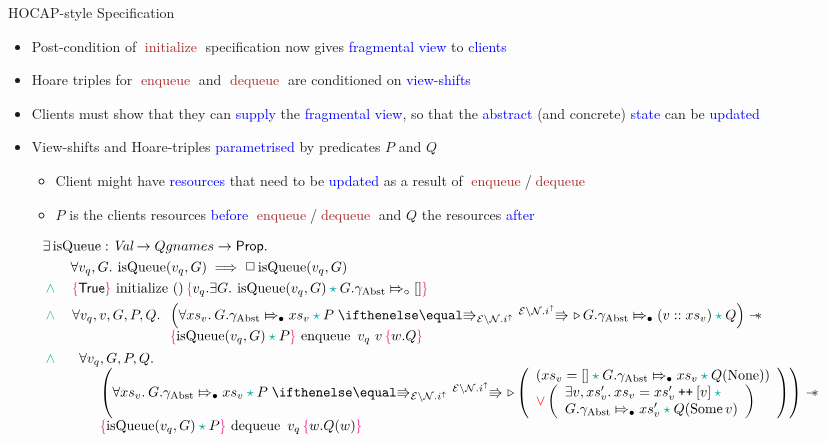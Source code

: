 \documentclass[9pt,xcolor={dvipsnames}]{beamer}
\newcommand{\initialise}{\operatorname{initialize}}
\newcommand{\enqueue}{\operatorname{enqueue}}
\newcommand{\dequeue}{\operatorname{dequeue}}
\newcommand{\isqueue}{\operatorname{isQueue}}
\newcommand{\Qgnames}{Qgnames}
\newcommand{\vq}{v_q}
\newcommand{\nodeval}{\valB}
\newcommand{\absvalue}{\val}
\newcommand{\absvalueList}{xs_v}
\newcommand{\Qg}{G}
\newcommand{\gabst}{\gname_{\mathrm{Abst}}}
\newcommand\catenate{\mathbin{\text{\ttfamily\upshape ++}}}
\newcommand{\Nl}{\ensuremath{\mathcal{N}}}
\newcommand{\abstractstatefullfrag}[2]{#1 \Mapsto_{\circ} #2}
\newcommand{\abstractstateauth}[2]{#1 \Mapsto_{\bullet} #2}
\newcommand{\hocapspecinitHTGen}[2]{\hoare{\TRUE}{\initialise \ \TT}{#1 . \Exists #2 . \isqueue(#1, #2) \star{} \abstractstatefullfrag{#2.\gabst}{[]}}}
\newcommand{\hocapspecinitGen}[2]{\hocapspecinitHTGen{#1}{#2}}
\newcommand{\hocapspecinit}{\hocapspecinitGen{\vq}{\Qg}}
\newcommand{\hocapspecenqVS}[5]{\abstractstateauth{#2.\gabst}{#5} \star{} #3 \vs[\mask\setminus\Nl.i^\uparrow] \later \abstractstateauth{#2.\gabst}{(#1 :: #5)} \star{} #4}
\newcommand{\hocapspecenqHT}[5]{\hoare{\isqueue(#1, #3) \star{} #4}{\enqueue \ #1 \ #2}{\valB . #5}}
\newcommand{\hocapspecenqGen}[6]{\All #1, #2, #3, #4, #5.
\begin{array}[t]{l}
\left(\All #6 . \hocapspecenqVS{#2}{#3}{#4}{#5}{#6} \right)
\wand\\
\hocapspecenqHT{#1}{#2}{#3}{#4}{#5}
\end{array}}
\newcommand{\hocapspecenq}{\hocapspecenqGen{\vq}{\absvalue}{\Qg}{P}{Q}{\absvalueList}}
\newcommand{\hocapspecdeqVSGen}[6]{
  \abstractstateauth{#1.\gabst}{#4} \star{} #2 \vs[\mask\setminus\Nl.i^\uparrow] \later
  \left(
    \begin{array}{l}
      (#4 = [] \star{} \abstractstateauth{#1.\gabst}{#4} \star{} #3(\None))\\
      \lor{}
      \left(
        \begin{array}{l}
          \Exists #5, #6 . #4 = #6 \catenate [#5] \star{}\\
          \abstractstateauth{#1.\gabst}{#6} \star{} #3(\Some{#5})
        \end{array}
        \right)
    \end{array}
  \right)
}
\newcommand{\hocapspecdeqVS}[4]{\hocapspecdeqVSGen{#1}{#2}{#3}{#4}{\absvalue}{#4'}}
\newcommand{\hocapspecdeqHT}[4]{\hoare{\isqueue(#1, #2) \star{} #3}{\dequeue \ #1}{\nodeval . #4(\nodeval)}}
\newcommand{\hocapspecdeqGen}[5]{\begin{array}[t]{l}
  \All #1, #2, #3, #4.\\
  \begin{array}[t]{l}
  \quad\left(\All #5 . \hocapspecdeqVS{#2}{#3}{#4}{#5} \right) \wand\\
  \quad\hocapspecdeqHT{#1}{#2}{#3}{#4}
  \end{array}
\end{array}}
\newcommand{\hocapspecdeq}{\hocapspecdeqGen{\vq}{\Qg}{P}{Q}{\absvalueList}}
\let\oldlor\lor
\renewcommand{\lor}{\begingroup \color{red} \oldlor \endgroup}
\let\oldland\land
\renewcommand{\land}{\begingroup \color{Emerald} \oldland \endgroup}
\let\oldstar\star
\renewcommand{\star}{\begingroup \color{Emerald} \oldstar \endgroup}
\begin{document}
\begin{frame}{HOCAP-style Specification}
  \begin{itemize}
    \item Post-condition of \textcolor{Brown}{$\initialise$} specification now gives \textcolor{blue}{fragmental view} to \textcolor{blue}{clients}
    \item Hoare triples for \textcolor{Brown}{$\enqueue$} and \textcolor{Brown}{$\dequeue$} are conditioned on \textcolor{blue}{view-shifts}
    \item Clients must show that they can \textcolor{blue}{supply} the \textcolor{blue}{fragmental view}, so that the \textcolor{blue}{abstract} (and concrete) \textcolor{blue}{state} can be \textcolor{blue}{updated}
    \item View-shifts and Hoare-triples \textcolor{blue}{parametrised} by predicates \textcolor{RubineRed}{$P$} and \textcolor{RubineRed}{$Q$}
      \begin{itemize}
        \item Client might have \textcolor{blue}{resources} that need to be \textcolor{blue}{updated} as a result of \textcolor{Brown}{$\enqueue$}/\textcolor{Brown}{$\dequeue$}
        \item \textcolor{RubineRed}{$P$} is the clients resources \textcolor{blue}{before} \textcolor{Brown}{$\enqueue$}/\textcolor{Brown}{$\dequeue$} and \textcolor{RubineRed}{$Q$} the resources \textcolor{blue}{after}
      \end{itemize}
  \end{itemize}
  \vspace{-4pt}
  \begin{definition}\label{QueueSpecs:spec:hocap}
    \setlength\abovedisplayskip{-8pt}
    \setlength\belowdisplayskip{2pt}
    \fontsize{7pt}{9}\selectfont
    \begin{align*}
      &\Exists \isqueue : \Val \to \Qgnames \to \Prop.\\
      &\quad\quad \All \vq, \Qg . \isqueue(\vq, \Qg) \implies \persistently \isqueue(\vq, \Qg)\\
      &\land{}\quad\hocapspecinit\\
      &\land{}\quad\hocapspecenq\\
      &\land{}\quad\hocapspecdeq
    \end{align*}
  \end{definition}
\end{frame}
\end{document}
